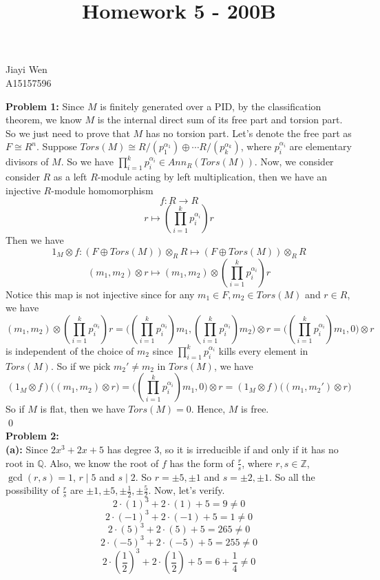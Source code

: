 \documentclass[12pt]{amsart}
\newcommand{\Q}{\mathbb{Q}}
\newcommand{\Z}{\mathbb{Z}}
\begin{document}
\title{Homework 5 - 200B}
\maketitle
\begin{center}
    Jiayi Wen\\
    A15157596
\end{center}
\textbf{Problem 1:} Since $M$ is finitely generated over a PID, by the classification theorem, we know $M$ is the internal direct sum of its free part and torsion part. So we just need to prove that $M$ has no torsion part. Let's denote the free part as $F\cong R^n$. Suppose $Tors(M)\cong R/(p_1^{\alpha_1})\oplus \cdots R/(p_k^{\alpha_k})$, where $p_i^{\alpha_i}$ are elementary divisors of $M$. So we have $\prod_{i=1}^kp_i^{\alpha_i}\in Ann_R(Tors(M))$. Now, we consider consider $R$ as a left $R$-module acting by left multiplication, then we have an injective $R$-module homomorphism 
\[f:R\to R\]
\[r\mapsto (\prod_{i=1}^kp_i^{\alpha_i})r\]
Then we have 
\[1_M\otimes f: (F\oplus Tors(M))\otimes_R R\mapsto (F\oplus Tors(M))\otimes_R R \]
\[(m_1,m_2)\otimes r\mapsto (m_1,m_2)
\otimes (\prod_{i=1}^kp_i^{\alpha_i})r\]
Notice this map is not injective since for any $m_1\in F, m_2\in Tors(M)$ and $r\in R$, we have 
\[(m_1,m_2)
\otimes (\prod_{i=1}^kp_i^{\alpha_i})r=\big((\prod_{i=1}^kp_i^{\alpha_i})m_1,(\prod_{i=1}^kp_i^{\alpha_i})m_2\big)\otimes r=\big((\prod_{i=1}^kp_i^{\alpha_i})m_1,0\big)\otimes r\]
is independent of the choice of $m_2$ since $\prod_{i=1}^kp_i^{\alpha_i}$ kills every element in $Tors(M)$.
So if we pick $m_2'\neq m_2$ in $Tors(M)$, we have 
\[(1_M\otimes f)\Big((m_1,m_2)\otimes r\Big)=\big((\prod_{i=1}^kp_i^{\alpha_i})m_1,0\big)\otimes r=(1_M\otimes f)\Big((m_1,m_2')\otimes r\Big)\] 
So if $M$ is flat, then we have $Tors(M)=0$. Hence, $M$ is free.
\\\qed\\
\textbf{Problem 2:}\\
\textbf{(a):} Since $2x^3+2x+5$ has degree 3, so it is irreducible if and only if it has no root in $\Q$. Also, we know the root of $f$ has the form of $\frac{r}{s}$, where $r,s\in\Z$, $\gcd(r,s)=1$, $r\mid 5$ and $s\mid 2$.
So $r=\pm 5,\pm 1$ and $s=\pm 2,\pm 1$. So all the possibility of $\frac{r}{s}
$ are $\pm 1,\pm 5,\pm\frac{1}{2},\pm\frac{5}{2}$. Now, let's verify.
\[2\cdot (1)^3+2\cdot (1)+5=9\neq 0\]
\[2\cdot (-1)^3+2\cdot (-1)+5=1\neq 0\]
\[2\cdot (5)^3+2\cdot (5)+5=265\neq 0\]
\[2\cdot (-5)^3+2\cdot (-5)+5=255\neq 0\]
\[2\cdot (\frac{1}{2})^3+2\cdot (\frac{1}{2})+5=6+\frac{1}{4}\neq 0\]
\end{document}

